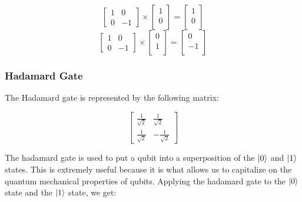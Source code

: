 \documentclass{article}
\begin{document}
\[
	\begin{bmatrix}
		1 & 0 \\
		0 & -1
	\end{bmatrix}
	\times
	\begin{bmatrix}
		1 \\
		0 \\
	\end{bmatrix}
	=
	\begin{bmatrix}
		1 \\
		0 \\
	\end{bmatrix}
\]
\[
	\begin{bmatrix}
		1 & 0 \\
		0 & -1
	\end{bmatrix}
	\times
	\begin{bmatrix}
		0 \\
		1 \\
	\end{bmatrix}
	=
	\begin{bmatrix}
		0 \\
		-1 \\
	\end{bmatrix}
\]

\subsubsection{Hadamard Gate}
\label{sec:hadamardgate}

The Hadamard gate is represented by the following matrix:

\[
	\begin{bmatrix}
		\frac{1}{\sqrt{2}} & \frac{1}{\sqrt{2}} \\
		\frac{1}{\sqrt{2}} & -\frac{1}{\sqrt{2}}
	\end{bmatrix}
\]

The hadamard gate is used to put a qubit into a superposition of the $\ket{0}$ and $\ket{1}$ states. This is extremely useful because it is what allows us to capitalize on the
quantum mechanical properties of qubits. Applying the hadamard gate to the $\ket{0}$ state and the $\ket{1}$ state, we get:
\end{document}
